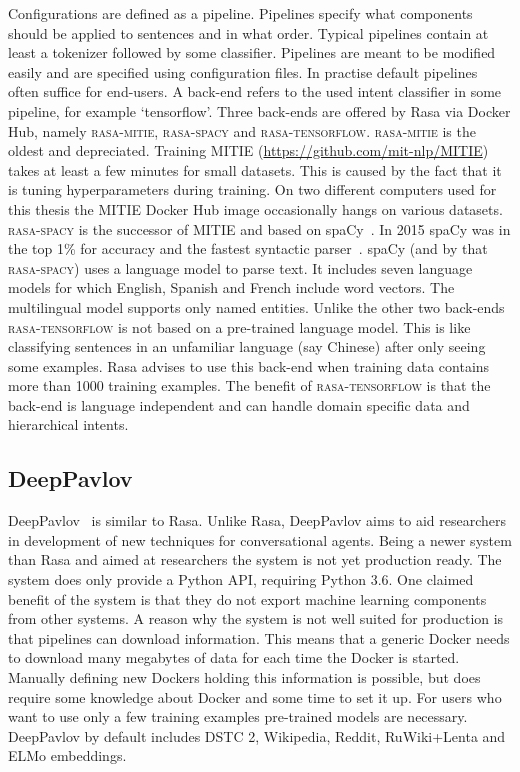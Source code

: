 Configurations are defined as a pipeline.
Pipelines specify what components should be applied to sentences and in what order.
Typical pipelines contain at least a tokenizer followed by some classifier.
Pipelines are meant to be modified easily and are specified using configuration files.
In practise default pipelines often suffice for end-users.
A back-end refers to the used intent classifier in some pipeline, for example `tensorflow'.
Three back-ends are offered by Rasa via Docker Hub, namely \textsc{rasa-mitie}, \textsc{rasa-spacy} and \textsc{rasa-tensorflow}.
\textsc{rasa-mitie} is the oldest and depreciated.
Training MITIE (\url{https://github.com/mit-nlp/MITIE}) takes at least a few minutes for small datasets.
This is caused by the fact that it is tuning hyperparameters during training.
On two different computers used for this thesis the MITIE Docker Hub image occasionally hangs on various datasets.
\textsc{rasa-spacy} is the successor of MITIE and based on spaCy~\citep{spacy2019}.
In 2015 spaCy was in the top 1\% for accuracy and the fastest syntactic parser~\citep{choi2015depends}.
spaCy (and by that \textsc{rasa-spacy}) uses a language model to parse text.
It includes seven language models for which English, Spanish and French include word vectors.
The multilingual model supports only named entities.
Unlike the other two back-ends \textsc{rasa-tensorflow} is not based on a pre-trained language model.
This is like classifying sentences in an unfamiliar language (say Chinese) after only seeing some examples.
Rasa advises to use this back-end when training data contains more than 1000 training examples.
The benefit of \textsc{rasa-tensorflow} is that the back-end is language independent and can handle domain specific data and hierarchical intents.

\subsection{DeepPavlov}
\label{subsec:deeppavlov}
DeepPavlov~\citep{burtsev2018} is similar to Rasa.
Unlike Rasa, DeepPavlov aims to aid researchers in development of new techniques for conversational agents.
Being a newer system than Rasa and aimed at researchers the system is not yet production ready.
The system does only provide a Python API, requiring Python 3.6.
One claimed benefit of the system is that they do not export machine learning components from other systems.
A reason why the system is not well suited for production is that pipelines can download information.
This means that a generic Docker needs to download many megabytes of data for each time the Docker is started.
Manually defining new Dockers holding this information is possible, but does require some knowledge about Docker and some time to set it up.
For users who want to use only a few training examples pre-trained models are necessary.
DeepPavlov by default includes DSTC 2, Wikipedia, Reddit, RuWiki+Lenta and ELMo embeddings.


